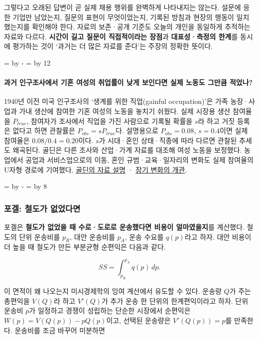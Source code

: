 \documentclass[10pt,a4paper]{article}
\newcommand{\ReserveQuestionSpace}{%
  \par\begingroup
  \dimen0=\pagegoal \advance\dimen0 by -\pagetotal
  \dimen2=\baselineskip \multiply\dimen2 by 12
  \ifdim\dimen0<\dimen2 \newpage\fi
  \endgroup}
\newcommand{\ReserveReadingSectionSpace}{%
  \par\begingroup
  \dimen0=\pagegoal \advance\dimen0 by -\pagetotal
  \dimen2=\baselineskip \multiply\dimen2 by 8
  \ifdim\dimen0<\dimen2 \newpage\fi
  \endgroup}
\begin{document}
그렇다고 오래된 답변이 곧 실제 채용 행위를 완벽하게 나타내지는 않는다. 설문에 응한 기업만 남았는지, 질문의 표현이 무엇이었는지, 기록된 방침과 현장의 행동이 일치했는지를 확인해야 한다. 자료의 보존·공개 기준도 오늘의 개인을 동일하게 추적하는 자료와 다르다. \textbf{시간이 길고 질문이 직접적이라는 장점}과 \textbf{대표성·측정의 한계}를 동시에 평가하는 것이 ‘과거는 더 많은 자료를 준다’는 주장의 정확한 뜻이다.\par

\ReserveQuestionSpace
\paragraph{과거 인구조사에서 기혼 여성의 취업률이 낮게 보인다면 실제 노동도 그만큼 적었나?}
1940년 이전 미국 인구조사의 ‘생계를 위한 직업(gainful occupation)’은 가족 농장·사업과 가내 생산에 참여한 기혼 여성의 노동을 놓치기 쉬웠다. 실제 시장용 생산 참여율을 $P_{true}$, 참여자가 조사에서 직업을 가진 사람으로 기록될 확률을 $s$라 하고 거짓 등록은 없다고 하면 관찰률은 $P_{obs}=sP_{true}$다. 설명용으로 $P_{obs}=0.08$, $s=0.4$이면 실제 참여율은 $0.08/0.4=0.20$이다. $s$가 시대·혼인 상태·직종에 따라 다르면 관찰된 추세도 왜곡된다. 골딘은 다른 조사와 산업·가계 자료를 대조해 여성 노동을 보정했다. 농업에서 공업과 서비스업으로의 이동, 혼인 규범·교육·일자리의 변화도 실제 참여율의 U자형 경로에 기여했다. \href{https://www.nobelprize.org/prizes/economic-sciences/2023/goldin/biographical/}{골딘의 자료 설명} · \href{https://www.nobelprize.org/prizes/economic-sciences/2023/popular-information/\_/}{장기 변화의 개관}.\par

\ReserveReadingSectionSpace
\subsubsection*{포겔: 철도가 없었다면}

포겔은 \textbf{철도가 없었을 때 수로·도로로 운송했다면 비용이 얼마였을지}를 계산했다. 철도의 단위 운송비를 $p_R$, 대안 운송비를 $p_A$, 운송 수요를 $q(p)$라고 하자. 대안 비용이 더 높을 때 철도가 만든 부분균형 순편익은 다음과 같다.\par

\[
SS=\int_{p_R}^{p_A} q(p)\,dp.
\]

이 면적이 왜 나오는지 미시경제학의 잉여 계산에서 유도할 수 있다. 운송량 $Q$가 주는 총편익을 $V(Q)$라 하고 $V'(Q)$가 추가 운송 한 단위의 한계편익이라고 하자. 단위 운송비 $p$가 일정하고 경쟁이 성립하는 단순한 시장에서 순편익은 $W(p)=V(Q(p))-pQ(p)$이고, 선택된 운송량은 $V'(Q(p))=p$를 만족한다. 운송비를 조금 바꾸어 미분하면\par
\end{document}
